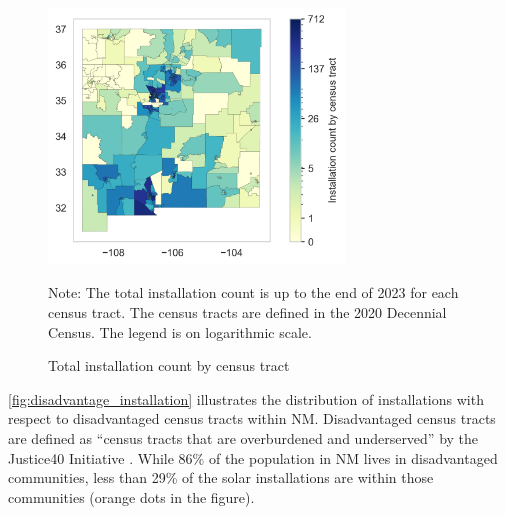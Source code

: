 \documentclass[11pt,twoside,letterpaper]{article}
\begin{document}
\begin{figure}[!ht]
    \centering
\includegraphics[width=0.7\textwidth]{figures/tract_count_map.png}
    \caption{Total installation count by census tract}
    \label{fig:tract_map}
    \begin{flushleft}
        \footnotesize Note: The total installation count is up to the end of 2023 for each census tract. The census tracts are defined in the 2020 Decennial Census. The legend is on logarithmic scale.
    \end{flushleft}
\end{figure}

\autoref{fig:disadvantage_installation} illustrates the distribution of installations with respect to disadvantaged census tracts within NM. Disadvantaged census tracts are defined as “census tracts that are overburdened and underserved” by the Justice40 Initiative \parencite{justice40}. While 86\% of the population in NM lives in disadvantaged communities, less than 29\% of the solar installations are within those communities (orange dots in the figure).
\end{document}
